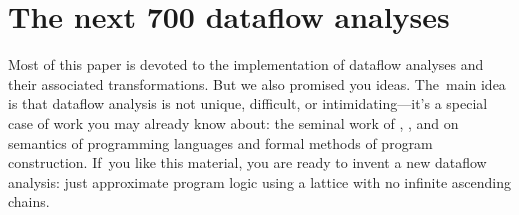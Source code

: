 \documentclass[blockstyle,preprint,nocopyrightspace]{sigplanconf}
\newcommand{\authornote}[1]{{\em #1}}
\def\authornote#1{\unskip\relax}
\newcommand{\simon}[1]{\authornote{SLPJ: #1}}
\newcommand{\norman}[1]{\authornote{NR: #1}}
\let\remark\norman
\newcommand\seclabel[1]{\label{sec:#1}}
\begin{document}
\section{The next 700 dataflow analyses}

\seclabel{logic}
\seclabel{next-700}



Most of this paper is devoted to the implementation of dataflow
analyses and their associated transformations.
But we also promised you ideas.
The~main idea is that dataflow analysis is not unique,
difficult, or intimidating---it's a special case of work you may
already know about:
the seminal work of
\citet{floyd:assigning-meanings},
\citet{hoare:axiomatic-basis},
and
\citet{dijkstra:discipline}
on semantics of programming languages and
 formal methods of program construction.
If~you like this material, you are ready to invent a new
dataflow analysis: just approximate program logic 
using a lattice with no infinite ascending chains.
\end{document}
